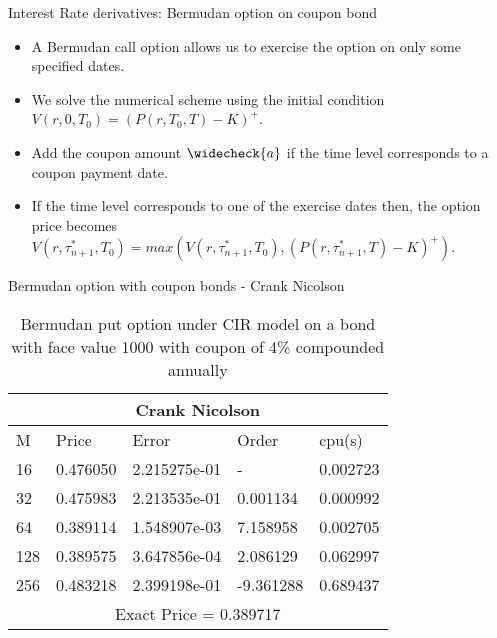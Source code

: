 \documentclass{beamer}
\begin{document}
\begin{frame}{Interest Rate derivatives: Bermudan option on coupon bond}
 
\begin{itemize}
    \item A Bermudan call option allows us to exercise the option on only some specified dates.
    \item We solve the numerical scheme using the initial condition $V(r,0,T_{0}) = (P(r,T_{0},T) - K)^{+}$.
    \item Add the coupon amount $\widecheck{a}$ if the time level corresponds to a coupon payment date.
    \item If the time level corresponds to one of the exercise dates then, the option price becomes $V(r,\tau^{*}_{n+1}, T_{0}) = max(V(r,\tau^{*}_{n+1}, T_{0}), (P(r,\tau^{*}_{n+1}, T)-K)^{+})$.
\end{itemize}
 
\end{frame}



 \begin{frame}{Bermudan option with coupon bonds - Crank Nicolson}
    \begin{table}[htp]
    \begin{tabular}{ |p{1cm}|p{1.7cm}|p{2.5cm}|p{2cm}|p{1.5cm}|  }
    
     \hline
     \multicolumn{5}{|c|}{Crank Nicolson} \\
     \hline
     M & Price & Error & Order & cpu(s)\\
     \hline
     16 & 0.476050 & 2.215275e-01 &  - & 0.002723\\
    32 & 0.475983 & 2.213535e-01 & 0.001134 & 0.000992\\
    64 & 0.389114 & 1.548907e-03 & 7.158958 & 0.002705\\
    128 & 0.389575 & 3.647856e-04 & 2.086129 & 0.062997\\
    256 & 0.483218 & 2.399198e-01 & -9.361288 & 0.689437\\
     \hline
     \multicolumn{5}{|c|}{Exact Price = 0.389717} \\
     \hline
     
    \end{tabular}
    \caption{ Bermudan put option under CIR model on a bond with face value 1000 with coupon of 4\% compounded annually}

        
    \end{table}
\end{frame}
 
\end{document}
